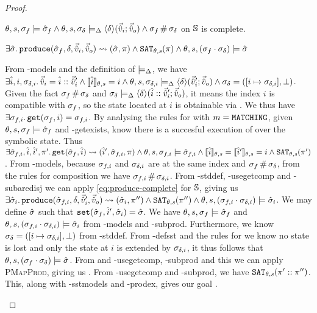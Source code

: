 \begin{proof}

\pfassume \begin{hypvlist}
 $\theta, s, \sigma_f \models \hat{\sigma}_f \land \theta, s, \sigma_\delta \models_{\Delta} \left<\delta\right>\!(\vec{\hat{v}}_i;\vec{\hat{v}}_o) \land \sigma_f\operatorname{\#}\sigma_\delta$
 \produce{} on $\mathbb S$ is complete.
\end{hypvlist}
\pfprove \begin{goalvlist}
 $\exists \hat{\sigma}\ldotp \texttt{produce}(\hat{\sigma}_f,\delta,\vec{\hat{v}}_i,\vec{\hat{v}}_o)\rightsquigarrow (\hat{\sigma},\pi) \land \texttt{SAT}_{\mathit{\theta,s}}(\pi) \land \theta,s,(\sigma_f\cdot\sigma_\delta) \models \hat{\sigma}$
\end{goalvlist}

\begin{hypvlist}
 From \hyp{models} and the definition of $\models_{\Delta}$, we have $\exists \hat{i},i,\sigma_{\delta,i} \ldotp \vec{\hat{v}}_i=\hat{i}::\vec{\hat{v}}_i' \land \llbracket\hat{i}\rrbracket_{\theta,s}=i \land \theta,s,\sigma_{\delta,i}\models_{\Delta} \left<\delta\right>\!(\vec{\hat{v}}_i';\vec{\hat{v}}_o) \land \sigma_\delta=([i\mapsto \sigma_{\delta,i}],\bot)$.
 Given the fact $\sigma_f\operatorname{\#}\sigma_\delta$ and $\sigma_\delta\models_{\Delta}\left<\delta\right>\!(\hat{i}::\vec{\hat{v}}_i';\vec{\hat{v}}_o)$, it means the index $i$ is compatible with $\sigma_f$, so the state located at $i$ is obtainable via . We thus have $\exists \sigma_{f,i} \ldotp {\ensuremath{\texttt{get}(\sigma_f,i)=\sigma_{f,i}}}$.
 By analysing the rules for  with $m=\texttt{MATCHING}$, given $\theta,s,\sigma_f\models\hat{\sigma}_f$ and \hyp{getexists}, know there is a succesful execution of  over the symbolic state. Thus $\exists \hat{\sigma}_{f,i},\hat{i},\hat{i}', \pi'\ldotp \texttt{get}(\hat{\sigma}_f,\hat{i})\rightsquigarrow(\hat{i}',\hat{\sigma}_{f,i},\pi) \land \theta,s,\sigma_{f,i}\models\hat{\sigma}_{f,i} \land \llbracket\hat{i}\rrbracket_{\theta,s}=\llbracket\hat{i}'\rrbracket_{\theta,s}=i \land \texttt{SAT}_{\mathit{\theta,s}}(\pi')$.
 From \hyp{models}, because $\sigma_{f,i}$ and $\sigma_{\delta,i}$ are at the same index and $\sigma_f\operatorname{\#}\sigma_\delta$, from the rules for composition we have $\sigma_{f,i}\operatorname{\#}\sigma_{\delta,i}$.
 From \hyp{stddef}, \hyp{usegetcomp} and \hyp{subaredisj} we can apply \ref{eq:produce-complete} for $\mathbb S$, giving us $\exists \hat{\sigma}_i\ldotp {\ensuremath{\texttt{produce}(\hat{\sigma}_{f,i},\delta,\vec{\hat{v}}_i',\vec{\hat{v}}_o)\rightsquigarrow (\hat{\sigma}_i,\pi'')}}\land\texttt{SAT}_{\mathit{\theta,s}}(\pi'') \land \theta,s,(\sigma_{f,i}\cdot\sigma_{\delta,i})\models\hat{\sigma}_i$.
 We may define $\hat{\sigma}$ such that $\texttt{set}(\hat{\sigma}_f,\hat{i}',\hat{\sigma}_i)=\hat{\sigma}$.
 We have $\theta, s, \sigma_f \models \hat{\sigma}_f$ and ${\theta,s,(\sigma_{f,i}\cdot\sigma_{\delta,i})\models\hat{\sigma}_i}$ from \hyp{models} and \hyp{subprod}. Furthermore, we know $\sigma_\delta=([i\mapsto \sigma_{\delta,i}],\bot)$ from \hyp{stddef}. From \hyp{defsst} and the rules for  we know no state is lost and only the state at $i$ is extended by $\sigma_{\delta,i}$, it thus follows that $\theta,s,(\sigma_f\cdot\sigma_\delta)\models\hat{\sigma}$.%
 From and \hyp{usegetcomp}, \hyp{subprod} and this we can apply \textsc{PMapProd}, giving us .
 From \hyp{usegetcomp} and \hyp{subprod}, we have $\texttt{SAT}_{\mathit{\theta,s}}(\pi'::\pi'')$. This, along with \hyp{sstmodels} and \hyp{prodex}, gives our goal .
\end{hypvlist}

\end{proof}

